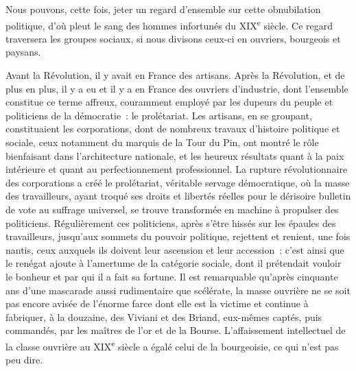 \documentclass[french,twoside]{book} %
\begin{document}
Nous pouvons, cette fois, jeter un regard d’ensemble sur cette obnubilation politique, d’où pleut le sang des hommes infortunés du XIX\textsuperscript{e} siècle. Ce regard traversera les groupes sociaux, si nous divisons ceux-ci en ouvriers, bourgeois et paysans.\par
Avant la Révolution, il y avait en France des artisans. Après la Révolution, et de plus en plus, il y a eu et il y a en France des ouvriers d’industrie, dont l’ensemble constitue ce terme affreux, couramment employé par les dupeurs du peuple et politiciens de la démocratie : le prolétariat. Les artisans, en se groupant, constituaient les corporations, dont de nombreux travaux d’histoire politique et sociale, ceux notamment du marquis de la Tour du Pin, ont montré le rôle bienfaisant dans l’architecture nationale, et les heureux résultats quant à la paix intérieure et quant au perfectionnement professionnel. La rupture révolutionnaire des corporations a créé le prolétariat, véritable servage démocratique, où la masse des travailleurs, ayant troqué ses droits et libertés réelles pour le dérisoire bulletin de vote au suffrage universel, se trouve transformée en machine à propulser des politiciens. Régulièrement ces politiciens, après s’être hissés sur les épaules des travailleurs, jusqu’aux sommets du pouvoir politique, rejettent et renient, une fois nantis, ceux auxquels ils doivent leur ascension et leur accession : c’est ainsi que le renégat ajoute à l’amertume de la catégorie sociale, dont il prétendait vouloir le bonheur et par qui il a fait sa fortune. Il est remarquable qu’après cinquante ans d’une mascarade aussi rudimentaire que scélérate, la masse ouvrière ne se soit pas encore avisée de l’énorme farce dont elle est la victime et continue à fabriquer, à la douzaine, des Viviani et des Briand, eux-mêmes captés, puis commandés, par les maîtres de l’or et de la Bourse. L’affaissement intellectuel de la classe ouvrière au XIX\textsuperscript{e} siècle a égalé celui de la bourgeoisie, ce qui n’est pas peu dire.\par
\end{document}
